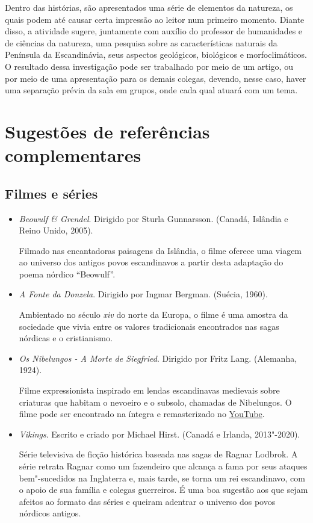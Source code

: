 \documentclass[12pt]{extarticle}
\begin{document}
Dentro das histórias, são apresentados uma série de elementos da
natureza, os quais podem até causar certa impressão ao leitor num
primeiro momento. Diante disso, a atividade sugere, juntamente com
auxílio do professor de humanidades e de ciências da natureza, uma
pesquisa sobre as características naturais da Península da
Escandinávia, seus aspectos geológicos, biológicos e morfoclimáticos.
O resultado dessa investigação pode ser trabalhado por meio de um
artigo, ou por meio de uma apresentação para os demais colegas,
devendo, nesse caso, haver uma separação prévia da sala em grupos,
onde cada qual atuará com um tema.

\section{Sugestões de referências complementares}\label{sugestoes}

\subsection{Filmes e séries}

\begin{itemize}

\item\textit{Beowulf \& Grendel}. Dirigido por Sturla Gunnarsson. (Canadá, Islândia e Reino Unido, 2005).

Filmado nas encantadoras paisagens da Islândia, o filme oferece uma viagem ao universo dos 
antigos povos escandinavos a partir desta adaptação do poema nórdico ``Beowulf''.

\item\textit{A Fonte da Donzela}. Dirigido por Ingmar Bergman. (Suécia, 1960).

Ambientado no século \textit{xiv} do norte da Europa, o filme é uma amostra da sociedade
que vivia entre os valores tradicionais encontrados nas sagas nórdicas e o cristianismo.

\item\textit{Os Nibelungos - A Morte de Siegfried}. Dirigido por Fritz Lang. (Alemanha, 1924).

Filme expressionista inspirado em lendas escandinavas medievais sobre criaturas que habitam o 
nevoeiro e o subsolo, chamadas de Nibelungos. O filme pode ser encontrado na íntegra 
e remasterizado no \href{https://www.youtube.com/watch?v=HH1BjSZYJ-w}{YouTube}.

\item\textit{Vikings}. Escrito e criado por Michael Hirst. (Canadá e Irlanda, 2013"-2020).

Série televisiva de ficção histórica baseada nas sagas de Ragnar Lodbrok. A série retrata 
Ragnar como um fazendeiro que alcança a fama por seus ataques bem"-sucedidos na Inglaterra e, 
mais tarde, se torna um rei escandinavo, com o apoio de sua família e colegas guerreiros. 
É uma boa sugestão aos que sejam afeitos ao formato das séries e queiram adentrar 
o universo dos povos nórdicos antigos.

\end{itemize}
\end{document}
